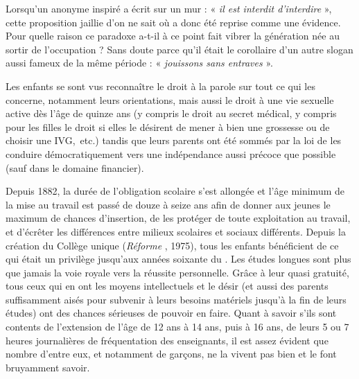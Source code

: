 \begin{table}[t]
\begin{table}[t]
 Lorsqu'un anonyme inspiré a écrit sur un mur : « \emph{il est interdit d'interdire} », cette proposition jaillie d'on ne sait où a donc été reprise comme une évidence. Pour quelle raison ce paradoxe a-t-il à ce point fait vibrer la génération née au sortir de l'occupation ? Sans doute parce qu'il était le corollaire d'un autre slogan aussi fameux de la même période : « \emph{jouissons sans entraves} ». 

 Les enfants se sont vus reconnaître le droit à la parole sur tout ce qui les concerne, notamment leurs orientations, mais aussi le droit à une vie sexuelle active dès l'âge de quinze ans (y compris le droit au secret médical, y compris pour les filles le droit si elles le désirent de mener à bien une grossesse ou de choisir une IVG,~etc.) tandis que leurs parents ont été sommés par la loi de les conduire démocratiquement vers une indépendance aussi précoce que possible (sauf dans le domaine financier). 

 Depuis 1882, la durée de l'obligation scolaire s'est allongée et l'âge minimum de la mise au travail est passé de douze à seize ans afin de donner aux jeunes le maximum de chances d'insertion, de les protéger de toute exploitation au travail, et d'écrêter les différences entre milieux scolaires et sociaux différents. Depuis la création du Collège unique (\emph{Réforme }, 1975), tous les enfants bénéficient de ce qui était un privilège jusqu'aux années soixante du . Les études longues sont plus que jamais la voie royale vers la réussite personnelle. Grâce à leur quasi gratuité, tous ceux qui en ont les moyens intellectuels et le désir (et aussi des parents suffisamment aisés pour subvenir à leurs besoins matériels jusqu'à la fin de leurs études) ont des chances sérieuses de pouvoir en faire. Quant à savoir s'ils sont contents de l'extension de l'âge de 12 ans à 14 ans, puis à 16 ans, de leurs 5 ou 7 heures journalières de fréquentation des enseignants, il est assez évident que nombre d'entre eux, et notamment de garçons, ne la vivent pas bien et le font bruyamment savoir.


\end{table}
\end{table}
